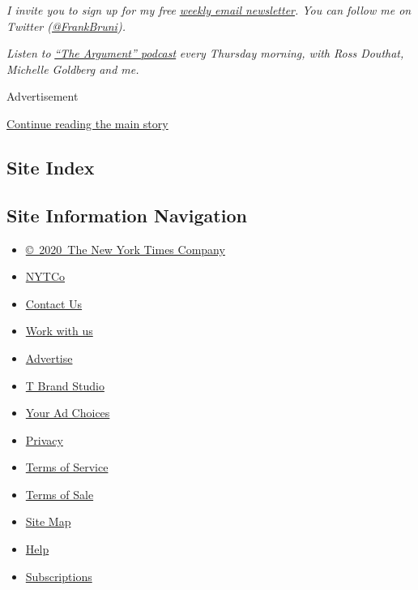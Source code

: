 \emph{I invite you to sign up for my free}
\href{https://www.nytimes.com/newsletters/frank-bruni}{\emph{weekly
email newsletter}}\emph{. You can follow me on Twitter
(}\href{https://twitter.com/FrankBruni}{\emph{@FrankBruni}}\emph{).}

\emph{Listen to}
\href{https://www.nytimes.com/column/the-argument}{\emph{``The
Argument'' podcast}} \emph{every Thursday morning, with Ross Douthat,
Michelle Goldberg and me.}

Advertisement

\protect\hyperlink{after-bottom}{Continue reading the main story}

\hypertarget{site-index}{%
\subsection{Site Index}\label{site-index}}

\hypertarget{site-information-navigation}{%
\subsection{Site Information
Navigation}\label{site-information-navigation}}

\begin{itemize}
\tightlist
\item
  \href{https://help.nytimes.com/hc/en-us/articles/115014792127-Copyright-notice}{©~2020~The
  New York Times Company}
\end{itemize}

\begin{itemize}
\tightlist
\item
  \href{https://www.nytco.com/}{NYTCo}
\item
  \href{https://help.nytimes.com/hc/en-us/articles/115015385887-Contact-Us}{Contact
  Us}
\item
  \href{https://www.nytco.com/careers/}{Work with us}
\item
  \href{https://nytmediakit.com/}{Advertise}
\item
  \href{http://www.tbrandstudio.com/}{T Brand Studio}
\item
  \href{https://www.nytimes.com/privacy/cookie-policy\#how-do-i-manage-trackers}{Your
  Ad Choices}
\item
  \href{https://www.nytimes.com/privacy}{Privacy}
\item
  \href{https://help.nytimes.com/hc/en-us/articles/115014893428-Terms-of-service}{Terms
  of Service}
\item
  \href{https://help.nytimes.com/hc/en-us/articles/115014893968-Terms-of-sale}{Terms
  of Sale}
\item
  \href{https://spiderbites.nytimes.com}{Site Map}
\item
  \href{https://help.nytimes.com/hc/en-us}{Help}
\item
  \href{https://www.nytimes.com/subscription?campaignId=37WXW}{Subscriptions}
\end{itemize}
